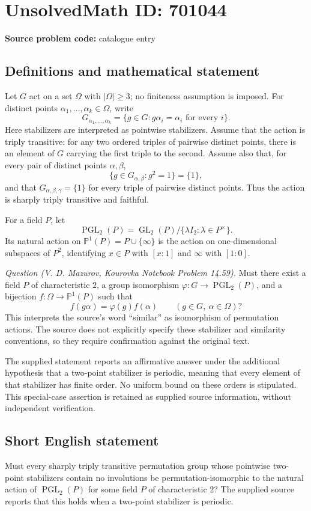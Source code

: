 \documentclass[11pt]{article}
\begin{document}
\section*{UnsolvedMath ID: 701044}
\textbf{Source problem code:} catalogue entry
\subsection{Definitions and mathematical statement}
Let \(G\) act on a set \(\Omega\) with \(|\Omega|\geq 3\); no finiteness assumption is imposed. For distinct points \(\alpha_1,\ldots,\alpha_k\in\Omega\), write
\[
G_{\alpha_1,\ldots,\alpha_k}=\{g\in G:g\alpha_i=\alpha_i\text{ for every }i\}.
\]
Here stabilizers are interpreted as pointwise stabilizers. Assume that the action is triply transitive: for any two ordered triples of pairwise distinct points, there is an element of \(G\) carrying the first triple to the second. Assume also that, for every pair of distinct points \(\alpha,\beta\),
\[
\{g\in G_{\alpha,\beta}:g^2=1\}=\{1\},
\]
and that \(G_{\alpha,\beta,\gamma}=\{1\}\) for every triple of pairwise distinct points. Thus the action is sharply triply transitive and faithful.

For a field \(P\), let
\[
\operatorname{PGL}_2(P)=\operatorname{GL}_2(P)/\{\lambda I_2:\lambda\in P^\times\}.
\]
Its natural action on \(\mathbb P^1(P)=P\cup\{\infty\}\) is the action on one-dimensional subspaces of \(P^2\), identifying \(x\in P\) with \([x:1]\) and \(\infty\) with \([1:0]\).

\emph{Question (V. D. Mazurov, Kourovka Notebook Problem 14.59).} Must there exist a field \(P\) of characteristic \(2\), a group isomorphism \(\varphi:G\to\operatorname{PGL}_2(P)\), and a bijection \(f:\Omega\to\mathbb P^1(P)\) such that
\[
f(g\alpha)=\varphi(g)f(\alpha)
\qquad(g\in G,\ \alpha\in\Omega)?
\]
This interprets the source's word ``similar'' as isomorphism of permutation actions. The source does not explicitly specify these stabilizer and similarity conventions, so they require confirmation against the original text.

The supplied statement reports an affirmative answer under the additional hypothesis that a two-point stabilizer is periodic, meaning that every element of that stabilizer has finite order. No uniform bound on these orders is stipulated. This special-case assertion is retained as supplied source information, without independent verification.
\subsection{Short English statement}
Must every sharply triply transitive permutation group whose pointwise two-point stabilizers contain no involutions be permutation-isomorphic to the natural action of \(\operatorname{PGL}_2(P)\) for some field \(P\) of characteristic \(2\)? The supplied source reports that this holds when a two-point stabilizer is periodic.
\end{document}
